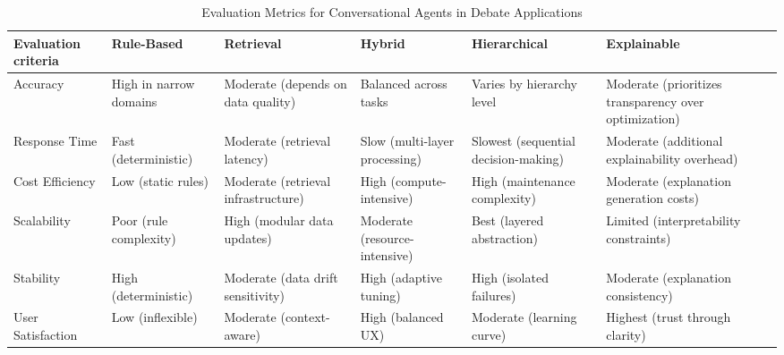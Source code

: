 \documentclass[conference]{IEEEtran}
\begin{document}
\begin{table}[ht]
    \centering
    \caption{Evaluation Metrics for Conversational Agents in Debate Applications}
    \label{tab:ai_models}
    \begin{tabular}{|>{\centering\arraybackslash}p{1.1cm}|>{\centering\arraybackslash}p{1.2cm}|>{\centering\arraybackslash}p{1.2cm}|>{\centering\arraybackslash}p{1.3cm}|>{\centering\arraybackslash}p{1.4cm}|>{\centering\arraybackslash}p{1.5cm}|}
    \hline
    \textbf{Evaluation criteria}  & \textbf{Rule-Based}                 & \textbf{Retrieval}                            & \textbf{Hybrid}\cite{b19}             & \textbf{Hierarchical} \cite{b18}                & \textbf{Explainable} \cite{b14} \cite{b17} \\ \hline
    Accuracy                      & High in narrow domains \cite{b14}   & Moderate (depends on data quality) \cite{b15} & Balanced across tasks                 & Varies by hierarchy level                 & Moderate (prioritizes transparency over optimization) \\ \hline
    Response Time \cite{b16}      & Fast (deterministic)                & Moderate (retrieval latency)                  & Slow (multi-layer processing)         & Slowest (sequential decision-making)      & Moderate (additional explainability overhead) \\ \hline
    Cost Efficiency               & Low (static rules)                  & Moderate (retrieval infrastructure)           & High (compute-intensive)              & High (maintenance complexity)             & Moderate (explanation generation costs) \\ \hline
    Scalability                   & Poor (rule complexity)              & High (modular data updates)                   & Moderate (resource-intensive)         & Best (layered abstraction)                & Limited (interpretability constraints) \\ \hline
    Stability                     & High (deterministic)                & Moderate (data drift sensitivity)             & High (adaptive tuning)                & High (isolated failures)                  & Moderate (explanation consistency) \\ \hline
    User Satisfaction             & Low (inflexible)                    & Moderate (context-aware)                      & High (balanced UX)                    & Moderate (learning curve)                 & Highest (trust through clarity) \\ \hline
    \end{tabular}
\end{table}
\end{document}
